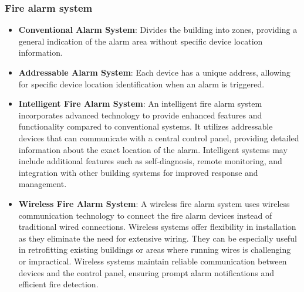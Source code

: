 \documentclass{article}
\begin{document}
\subsubsection*{Fire alarm system} 
\begin{itemize}
  \item \textbf{Conventional Alarm System}: Divides the building into zones, providing a general indication of the alarm area without specific device location information.

  \item \textbf{Addressable Alarm System}: Each device has a unique address, allowing for specific device location identification when an alarm is triggered.

  \item \textbf{Intelligent Fire Alarm System}: An intelligent fire alarm system incorporates advanced technology to provide enhanced features and functionality compared to conventional systems. It utilizes addressable devices that can communicate with a central control panel, providing detailed information about the exact location of the alarm. Intelligent systems may include additional features such as self-diagnosis, remote monitoring, and integration with other building systems for improved response and management.

  \item \textbf{Wireless Fire Alarm System}: A wireless fire alarm system uses wireless communication technology to connect the fire alarm devices instead of traditional wired connections. Wireless systems offer flexibility in installation as they eliminate the need for extensive wiring. They can be especially useful in retrofitting existing buildings or areas where running wires is challenging or impractical. Wireless systems maintain reliable communication between devices and the control panel, ensuring prompt alarm notifications and efficient fire detection.
\end{itemize}
\end{document}

